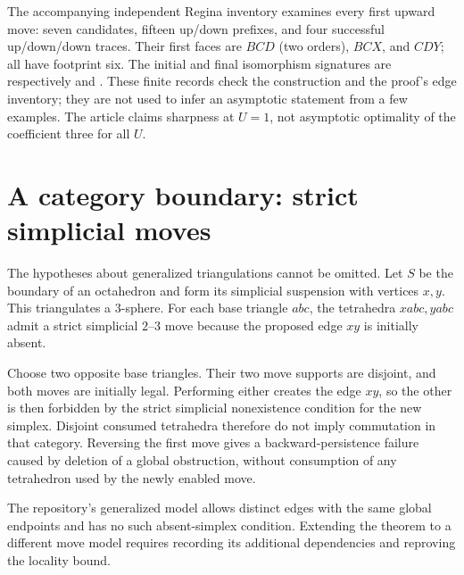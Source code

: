 The accompanying independent Regina inventory examines every first upward
move: seven candidates, fifteen up/down prefixes, and four successful
up/down/down traces. Their first faces are $BCD$ (two orders), $BCX$, and
$CDY$; all have footprint six. The initial and final isomorphism signatures
are respectively  and . These finite records
check the construction and the proof's edge inventory; they are not used to
infer an asymptotic statement from a few examples. The article claims sharpness
at $U=1$, not asymptotic optimality of the coefficient three for all $U$.

\section{A category boundary: strict simplicial moves}

The hypotheses about generalized triangulations cannot be omitted. Let $S$
be the boundary of an octahedron and form its simplicial suspension with
vertices $x,y$. This triangulates a $3$-sphere. For each base triangle $abc$,
the tetrahedra $xabc,yabc$ admit a strict simplicial $2$--$3$ move because
the proposed edge $xy$ is initially absent.

Choose two opposite base triangles. Their two move supports are disjoint,
and both moves are initially legal. Performing either creates the edge
$xy$, so the other is then forbidden by the strict simplicial nonexistence
condition for the new simplex. Disjoint consumed tetrahedra therefore do
not imply commutation in that category. Reversing the first move gives a
backward-persistence failure caused by deletion of a global obstruction,
without consumption of any tetrahedron used by the newly enabled move.

The repository's generalized model allows distinct edges with the same
global endpoints and has no such absent-simplex condition. Extending the
theorem to a different move model requires recording its additional
dependencies and reproving the locality bound.
